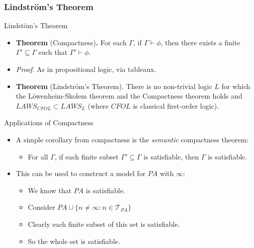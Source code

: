 \subsubsection{Lindstr\"om's Theorem}
\begin{frame}{Lindst\"om's Theorem}

  \begin{itemize}

  \item \textbf{Theorem} (Compactness)\textbf{.} For each $\Gamma$, if
    $\Gamma\vdash\phi$, then there exists a finite
    $\Gamma'\subseteq\Gamma$ such that $\Gamma'\vdash\phi$.

  \item \emph{Proof}. As in propositional logic, via tableaux.

   \item \textbf{Theorem} (Lindstr\"om's Theorem). There is no
     non-trivial logic $L$ for which the L\"owenheim-Skolem theorem
     and the Compactness theorem holds and $LAWS_{CFOL}\subset
     LAWS_L$ (where $CFOL$ is classical first-order logic).
    
  \end{itemize}
  
\end{frame}

\begin{frame}{Applications of Compactness}

  \begin{itemize}
  \item A simple corollary from compactness is the \emph{semantic}
    compactness theorem:
    \begin{itemize}
    \item For all $\Gamma$, if each finite subset
      $\Gamma'\subseteq\Gamma$ is satisfiable, then $\Gamma$ is satisfiable.
    \end{itemize}

    \item This can be used to construct a model for $PA$ with
      $\infty$:

      \begin{itemize}
      \item We know that $PA$ is satisfiable.
      \item Consider $PA\cup\{n\neq \infty:n\in\mathcal{T}_{PA}\}$
      \item Clearly each finite subset of this set is satisfiable.
      \item So the whole set is satisfiable.
        
      \end{itemize}
  \end{itemize}
  
\end{frame}

